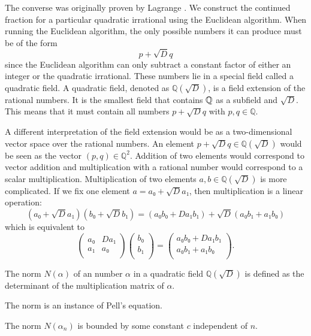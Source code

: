 The converse was originally proven by Lagrange \cite{Lagrange70}.
We construct the continued fraction for a particular quadratic irrational using
the Euclidean algorithm.
When running the Euclidean algorithm,
the only possible numbers it can produce must be of the form
\[
  p + \sqrt{D} q
\]
since the Euclidean algorithm can only subtract a constant factor of either an
integer or the quadratic irrational.
These numbers lie in a special field called a quadratic field.
A quadratic field, denoted as $ℚ(\sqrt{D})$, is a field extension of the rational numbers.
It is the smallest field that contains ${\mathbb Q}$ as a subfield and $\sqrt{D}$.
This means that it must contain all numbers $p + \sqrt{D} q$ with $p, q ∈ ℚ$.

A different interpretation of the field extension would be as a two-dimensional
vector space over the rational numbers.
An element $p + \sqrt{D} q ∈ ℚ(\sqrt{D})$ would be seen as the vector $(p, q) ∈ ℚ^2$.
Addition of two elements would correspond to vector addition
and multiplication with a rational number would correspond to a scalar multiplication.
Multiplication of two elements $a, b ∈ ℚ(\sqrt{D})$ is more complicated.
If we fix one element $a = a₀ + \sqrt{D} a₁$, then multiplication is a linear operation:
\[
  (a₀ + \sqrt{D} a₁)(b₀ + \sqrt{D} b₁) = (a₀ b₀ + D a₁ b₁) + \sqrt{D} (a₀ b₁ + a₁ b₀)
\]
which is equivalent to
\[
  \begin{pmatrix}
    a₀ & D a₁ \\
    a₁ & a₀ \\
  \end{pmatrix}
  \begin{pmatrix}
    b₀ \\
    b₁ \\
  \end{pmatrix}
  =
  \begin{pmatrix}
    a₀ b₀ + D a₁ b₁ \\
    a₀ b₁ + a₁ b₀ \\
  \end{pmatrix}.
\]

\begin{definition}
  The norm $N(α)$ of an number $α$ in a quadratic field $ℚ(\sqrt{D})$ is defined as
  the determinant of the multiplication matrix of $α$.
\end{definition}

The norm is an instance of Pell's equation.

\begin{lemma}
  The norm $N(α_n)$ is bounded by some constant $c$ independent of $n$.
\end{lemma}

